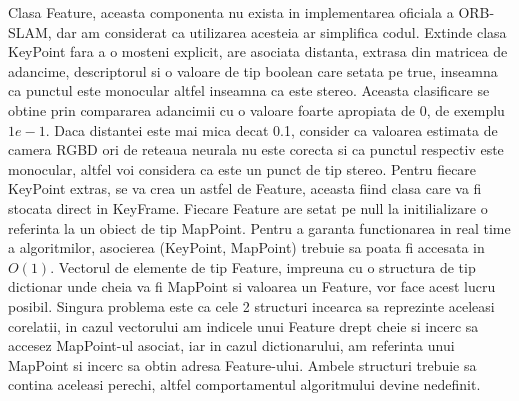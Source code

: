 \documentclass[12pt,a4paper]{report}
\begin{document}
Clasa Feature, aceasta componenta nu exista in implementarea oficiala a ORB-SLAM, dar am considerat 
ca utilizarea acesteia ar simplifica codul. Extinde clasa KeyPoint fara a o mosteni explicit,
are asociata distanta, extrasa din matricea de adancime, descriptorul
si o valoare de tip boolean care setata pe true, inseamna ca punctul este monocular altfel inseamna
ca este stereo. Aceasta clasificare se obtine prin compararea adancimii cu o valoare foarte apropiata
de 0, de exemplu  $ 1e-1 $. Daca distantei este mai mica decat 0.1, consider ca valoarea estimata de 
camera RGBD ori de reteaua neurala nu este corecta si ca punctul respectiv este monocular,
altfel voi considera ca este un punct de tip stereo. Pentru fiecare KeyPoint extras, se va 
crea un astfel de Feature, aceasta fiind clasa care va fi stocata direct in KeyFrame. Fiecare
 Feature are setat pe null la initilializare o referinta la un obiect 
de tip MapPoint. Pentru a garanta functionarea in real time a algoritmilor, asocierea (KeyPoint,
 MapPoint) trebuie sa poata fi accesata in $ O(1) $. Vectorul de elemente
de tip Feature, impreuna cu o structura de tip dictionar unde cheia va fi MapPoint si valoarea 
un Feature, vor face acest lucru posibil. Singura problema este ca cele 2 structuri incearca sa 
reprezinte aceleasi corelatii, in cazul vectorului am indicele unui Feature drept cheie si incerc
sa accesez MapPoint-ul asociat, iar in cazul dictionarului, am referinta unui MapPoint si incerc sa
obtin adresa Feature-ului. Ambele structuri trebuie sa contina aceleasi perechi, altfel 
comportamentul algoritmului devine nedefinit. \\
\end{document}
